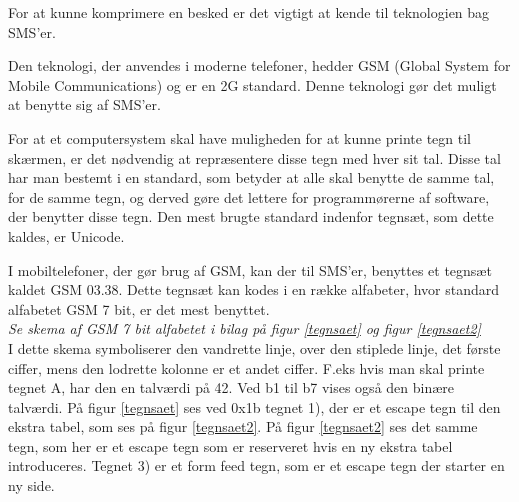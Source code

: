 For at kunne komprimere en besked er det vigtigt at kende til teknologien bag SMS'er.

Den teknologi, der anvendes i moderne telefoner, hedder GSM (Global System for Mobile Communications) og er en 2G standard. Denne teknologi gør det muligt at benytte sig af SMS'er.\cite{GSM_term}

For at et computersystem skal have muligheden for at kunne printe tegn til skærmen, er det nødvendig at repræsentere disse tegn med hver sit tal. Disse tal har man bestemt i en standard, som betyder at alle skal benytte de samme tal, for de samme tegn, og derved gøre det lettere for programmørerne af software, der benytter disse tegn. Den mest brugte standard indenfor tegnsæt, som dette kaldes, er Unicode.\cite{UNICODE_standard}

I mobiltelefoner, der gør brug af GSM, kan der til SMS'er, benyttes et tegnsæt kaldet GSM 03.38. Dette tegnsæt kan kodes i en række alfabeter, hvor standard alfabetet GSM 7 bit, er det mest benyttet.
\\
\emph {Se skema af GSM 7 bit alfabetet i  bilag på figur \ref{tegnsaet} og figur \ref{tegnsaet2}}
\\
I dette skema symboliserer den vandrette linje, over den stiplede linje, det første ciffer, mens den lodrette kolonne er et andet ciffer. F.eks hvis man skal printe tegnet A, har den en talværdi på 42. Ved b1 til b7 vises også den binære talværdi.
På figur \ref{tegnsaet} ses ved 0x1b tegnet 1), der er et escape tegn til den ekstra tabel, som ses på figur \ref{tegnsaet2}. På figur \ref{tegnsaet2} ses det samme tegn, som her er et escape tegn som er reserveret hvis en ny ekstra tabel introduceres. Tegnet 3) er et form feed tegn, som er et escape tegn der starter en ny side.\cite{GSM_7_bit}
